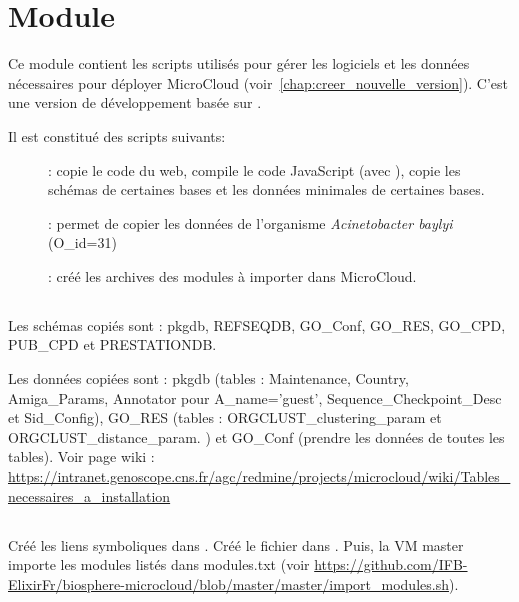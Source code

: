 \chapter{Module \micWEBdeployVer}


Ce module contient les scripts utilisés pour gérer les logiciels et les données nécessaires pour déployer MicroCloud (voir~\autoref{chap:creer_nouvelle_version}).
C'est une version de développement basée sur .

Il est constitué des scripts suivants:
\begin{description}
	\item[]: copie le code du web, compile le code JavaScript (avec ), copie les schémas de certaines bases et les données minimales de certaines bases.
	\item[]: permet de copier les données de l'organisme \textit{Acinetobacter baylyi} (O\_id=31)
	\item[]: créé les archives des modules à importer dans MicroCloud.
\end{description}

\section{}

Les schémas copiés sont : pkgdb, REFSEQDB, GO\_Conf, GO\_RES, GO\_CPD, PUB\_CPD et PRESTATIONDB.
\newline

Les données copiées sont : pkgdb (tables : Maintenance, Country, Amiga\_Params,
Annotator pour A\_name='guest', Sequence\_Checkpoint\_Desc et Sid\_Config), GO\_RES (tables : ORGCLUST\_clustering\_param et ORGCLUST\_distance\_param.
) et GO\_Conf (prendre les données de toutes les tables). Voir page wiki : \url{https://intranet.genoscope.cns.fr/agc/redmine/projects/microcloud/wiki/Tables_necessaires_a_installation}


\section{}

Créé les liens symboliques dans .
Créé le fichier  dans .
\newline
Puis, la VM master importe les modules listés dans modules.txt (voir \url{https://github.com/IFB-ElixirFr/biosphere-microcloud/blob/master/master/import_modules.sh}).

